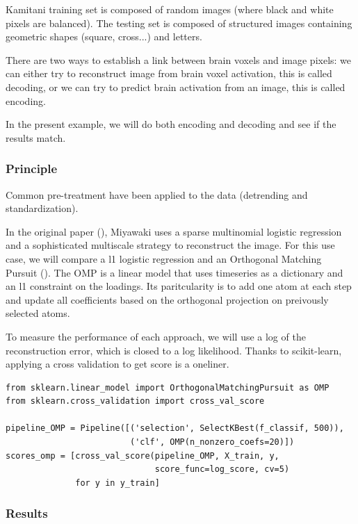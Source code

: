 \documentclass{frontiersSCNS} %
\begin{document}
Kamitani training set is composed of random images (where black and white pixels
are balanced). The testing set is composed of structured images containing
geometric shapes (square, cross...) and letters.

There are two ways to establish a link between brain voxels and image pixels: we
can either try to reconstruct image from brain voxel activation, this is called
decoding, or we can try to predict brain activation from an image, this is called
encoding.

In the present example, we will do both encoding and decoding and see if the
results match.

\subsubsection{Principle} %

Common pre-treatment have been applied to the data (detrending and
standardization).

In the original paper (\cite{miyawaki2008}), Miyawaki uses a sparse multinomial
logistic regression and a sophisticated multiscale strategy to reconstruct the image.
For this use case, we will compare a l1 logistic regression and an Orthogonal
Matching Pursuit (\cite{mallat1993}). The OMP is a linear model that uses
timeseries as a dictionary and an l1 constraint on the loadings. Its
paritcularity is to add one atom at each step and update all coefficients
based on the orthogonal projection on preivously selected atoms.

To measure the performance of each approach, we will use a log of the
reconstruction error, which is closed to a log likelihood. Thanks to
scikit-learn, applying a cross validation to get score is a oneliner.

\begin{lstlisting}
from sklearn.linear_model import OrthogonalMatchingPursuit as OMP
from sklearn.cross_validation import cross_val_score

pipeline_OMP = Pipeline([('selection', SelectKBest(f_classif, 500)),
                         ('clf', OMP(n_nonzero_coefs=20)])
scores_omp = [cross_val_score(pipeline_OMP, X_train, y,
                              score_func=log_score, cv=5)
              for y in y_train]
\end{lstlisting}

\subsubsection{Results}
\end{document}
